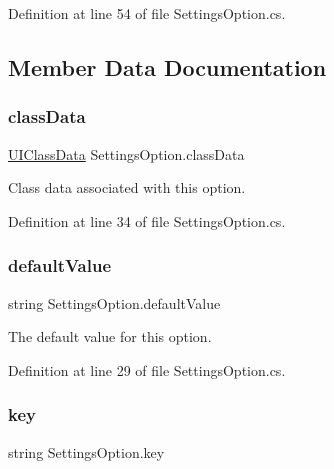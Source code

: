 Definition at line 54 of file Settings\+Option.\+cs.



\subsection{Member Data Documentation}
\mbox{\label{struct_settings_option_abacd826cad9a79d394bffbb78f51e9eb}} 
\subsubsection{\texorpdfstring{class\+Data}{classData}}
{\footnotesize\ttfamily \hyperlink{struct_u_i_class_data}{U\+I\+Class\+Data} Settings\+Option.\+class\+Data}



Class data associated with this option. 



Definition at line 34 of file Settings\+Option.\+cs.

\mbox{\label{struct_settings_option_ad1803ed7f7f271e958ca15612fe0f7d2}} 
\subsubsection{\texorpdfstring{default\+Value}{defaultValue}}
{\footnotesize\ttfamily string Settings\+Option.\+default\+Value}



The default value for this option. 



Definition at line 29 of file Settings\+Option.\+cs.

\mbox{\label{struct_settings_option_ac60a29ea672ec85132988edcc63231c9}} 
\subsubsection{\texorpdfstring{key}{key}}
{\footnotesize\ttfamily string Settings\+Option.\+key}



